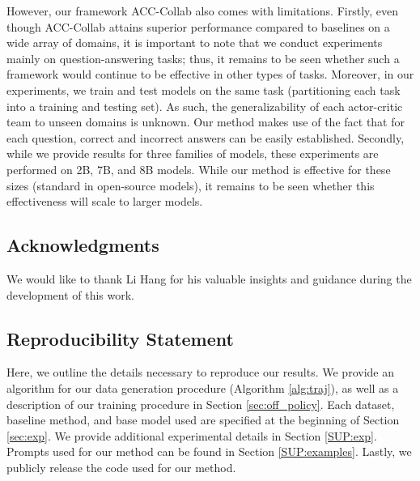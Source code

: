 \documentclass{article}
\begin{document}
However, our framework ACC-Collab also comes with limitations. Firstly, even though ACC-Collab attains superior performance compared to baselines on a wide array of domains, it is important to note that we conduct experiments mainly on question-answering tasks; thus, it remains to be seen whether such a framework would continue to be effective in other types of tasks. 
Moreover, in our experiments, we train and test models on the same task (partitioning each task into a training and testing set). As such, the generalizability of each actor-critic team to unseen domains is unknown.
Our method makes use of the fact that for each question, correct and incorrect answers can be easily established.
Secondly, while we provide results for three families of models, these experiments are performed on 2B, 7B, and 8B models. 
While our method is effective for these sizes (standard in open-source models), it remains to be seen whether this effectiveness will scale to larger models. 


\newpage
\subsection*{Acknowledgments}
We would like to thank Li Hang for his valuable insights and guidance during the development of this work.

\subsection*{Reproducibility Statement}
Here, we outline the details necessary to reproduce our results. 
We provide an algorithm for our data generation procedure (Algorithm \ref{alg:traj}), as well as a description of our training procedure in Section \ref{sec:off_policy}.
Each dataset, baseline method, and base model used are specified at the beginning of Section \ref{sec:exp}. 
We provide additional experimental details in Section \ref{SUP:exp}. 
Prompts used for our method can be found in Section \ref{SUP:examples}.
Lastly, we publicly release the code used for our method.








\newpage
\appendix

\end{document}
